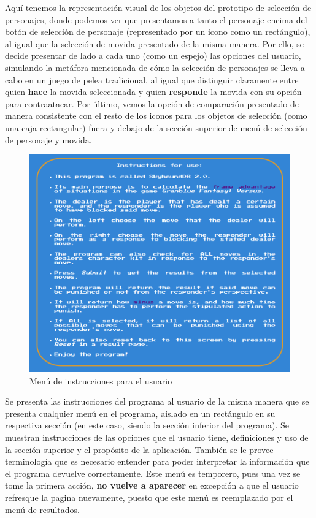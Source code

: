     Aquí tenemos la representación visual de los objetos del prototipo de selección de personajes, donde podemos ver que presentamos a tanto el personaje encima del botón de selección de personaje (representado por un icono como un rectángulo), al igual que la selección de movida presentado de la misma manera. Por ello, se decide presentar de lado a cada uno (como un espejo) las opciones del usuario, simulando la metáfora mencionada de cómo la selección de personajes se lleva a cabo en un juego de pelea tradicional, al igual que distinguir claramente entre quien \textbf{hace} la movida seleccionada y quien \textbf{responde} la movida con su  opción para contraatacar. Por último, vemos la opción de comparación presentado de manera consistente con el resto de los iconos para los objetos de selección (como una caja rectangular) fuera y debajo de la sección superior de menú de selección de personaje y movida.

\begin{center}
    \begin{figure}
        \centering
        \includegraphics[height=0.4\textheight]{figures/Instructions_menu-object.png}
        \caption{Menú de instrucciones para el usuario}
        \label{fig: ins prt}
    \end{figure}
\end{center}

\newpage
    Se presenta las instrucciones del programa al usuario de la misma manera que se presenta cualquier menú en el programa, aislado en un rectángulo en su respectiva sección (en este caso, siendo la sección inferior del programa). Se muestran instrucciones de las opciones que el usuario tiene, definiciones y uso de la sección superior y el propósito de la aplicación. También se le provee terminología que es necesario entender para poder interpretar la información que el programa devuelve correctamente. Este menú es temporero, pues una vez se tome la primera acción, \textbf{no vuelve a aparecer} en excepción a que el usuario refresque la pagina nuevamente, puesto que este menú es reemplazado por el menú de resultados.

